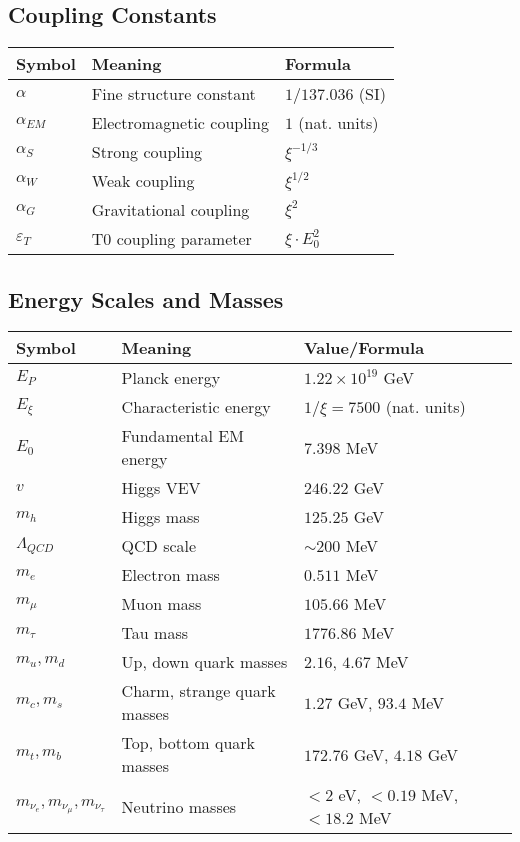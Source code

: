 \documentclass[12pt,a4paper]{article}
\begin{document}
\subsection{Coupling Constants}
\begin{longtable}{lll}
	\toprule
	\textbf{Symbol} & \textbf{Meaning} & \textbf{Formula} \\
	\midrule
	$\alpha$ & Fine structure constant & $1/137.036$ (SI) \\
	$\alpha_{EM}$ & Electromagnetic coupling & $1$ (nat. units) \\
	$\alpha_S$ & Strong coupling & $\xi^{-1/3}$ \\
	$\alpha_W$ & Weak coupling & $\xi^{1/2}$ \\
	$\alpha_G$ & Gravitational coupling & $\xi^{2}$ \\
	$\varepsilon_T$ & T0 coupling parameter & $\xi \cdot E_0^2$ \\
	\bottomrule
\end{longtable}

\subsection{Energy Scales and Masses}
\begin{longtable}{lll}
	\toprule
	\textbf{Symbol} & \textbf{Meaning} & \textbf{Value/Formula} \\
	\midrule
	$E_P$ & Planck energy & $1.22 \times 10^{19}$ GeV \\
	$E_\xi$ & Characteristic energy & $1/\xi = 7500$ (nat. units) \\
	$E_0$ & Fundamental EM energy & $7.398$ MeV \\
	$v$ & Higgs VEV & $246.22$ GeV \\
	$m_h$ & Higgs mass & $125.25$ GeV \\
	$\Lambda_{QCD}$ & QCD scale & $\sim 200$ MeV \\
	$m_e$ & Electron mass & $0.511$ MeV \\
	$m_\mu$ & Muon mass & $105.66$ MeV \\
	$m_\tau$ & Tau mass & $1776.86$ MeV \\
	$m_u, m_d$ & Up, down quark masses & $2.16$, $4.67$ MeV \\
	$m_c, m_s$ & Charm, strange quark masses & $1.27$ GeV, $93.4$ MeV \\
	$m_t, m_b$ & Top, bottom quark masses & $172.76$ GeV, $4.18$ GeV \\
	$m_{\nu_e}, m_{\nu_\mu}, m_{\nu_\tau}$ & Neutrino masses & $< 2$ eV, $< 0.19$ MeV, $< 18.2$ MeV \\
	\bottomrule
\end{longtable}
\end{document}
